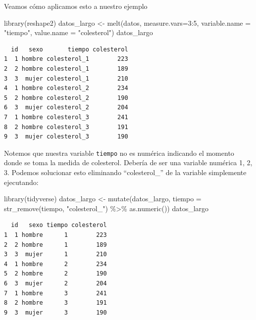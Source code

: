 \documentclass[
]{book}
\newenvironment{Shaded}{\begin{snugshade}}{\end{snugshade}}
\newcommand{\AttributeTok}[1]{\textcolor[rgb]{0.77,0.63,0.00}{#1}}
\newcommand{\DecValTok}[1]{\textcolor[rgb]{0.00,0.00,0.81}{#1}}
\newcommand{\FunctionTok}[1]{\textcolor[rgb]{0.00,0.00,0.00}{#1}}
\newcommand{\NormalTok}[1]{#1}
\newcommand{\OtherTok}[1]{\textcolor[rgb]{0.56,0.35,0.01}{#1}}
\newcommand{\SpecialCharTok}[1]{\textcolor[rgb]{0.00,0.00,0.00}{#1}}
\newcommand{\StringTok}[1]{\textcolor[rgb]{0.31,0.60,0.02}{#1}}
\begin{document}
Veamos cómo aplicamos esto a nuestro ejemplo

\begin{Shaded}
\begin{Highlighting}[]
\FunctionTok{library}\NormalTok{(reshape2)}
\NormalTok{datos\_largo }\OtherTok{\textless{}{-}} \FunctionTok{melt}\NormalTok{(datos, }\AttributeTok{measure.vars=}\DecValTok{3}\SpecialCharTok{:}\DecValTok{5}\NormalTok{,}
                    \AttributeTok{variable.name =} \StringTok{"tiempo"}\NormalTok{,}
                    \AttributeTok{value.name =} \StringTok{"colesterol"}\NormalTok{)}
\NormalTok{datos\_largo}
\end{Highlighting}
\end{Shaded}

\begin{verbatim}
  id   sexo       tiempo colesterol
1  1 hombre colesterol_1        223
2  2 hombre colesterol_1        189
3  3  mujer colesterol_1        210
4  1 hombre colesterol_2        234
5  2 hombre colesterol_2        190
6  3  mujer colesterol_2        204
7  1 hombre colesterol_3        241
8  2 hombre colesterol_3        191
9  3  mujer colesterol_3        190
\end{verbatim}

Notemos que nuestra variable \texttt{tiempo} no es numérica indicando el momento donde se toma la medida de colesterol. Debería de ser una variable numérica 1, 2, 3. Podemos solucionar esto eliminando ``colesterol\_'' de la variable simplemente ejecutando:

\begin{Shaded}
\begin{Highlighting}[]
\FunctionTok{library}\NormalTok{(tidyverse)}
\NormalTok{datos\_largo }\OtherTok{\textless{}{-}} \FunctionTok{mutate}\NormalTok{(datos\_largo, }
                      \AttributeTok{tiempo =} \FunctionTok{str\_remove}\NormalTok{(tiempo, }\StringTok{"colesterol\_"}\NormalTok{) }\SpecialCharTok{\%\textgreater{}\%}
                      \FunctionTok{as.numeric}\NormalTok{())}
\NormalTok{datos\_largo}
\end{Highlighting}
\end{Shaded}

\begin{verbatim}
  id   sexo tiempo colesterol
1  1 hombre      1        223
2  2 hombre      1        189
3  3  mujer      1        210
4  1 hombre      2        234
5  2 hombre      2        190
6  3  mujer      2        204
7  1 hombre      3        241
8  2 hombre      3        191
9  3  mujer      3        190
\end{verbatim}
\end{document}
